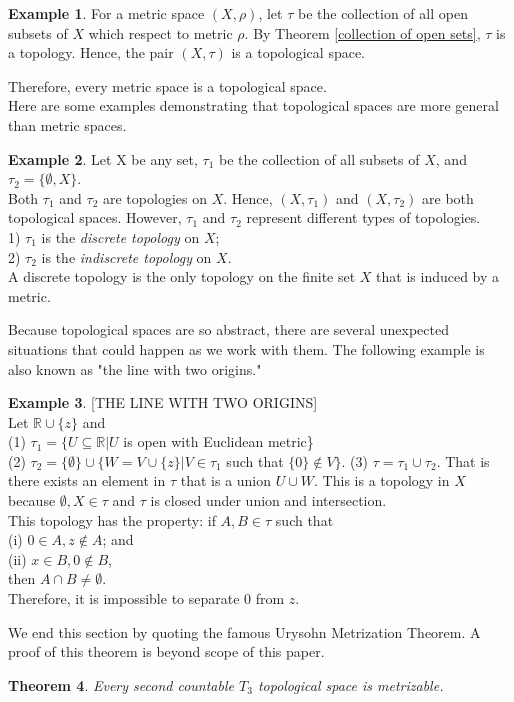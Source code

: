 \documentclass[12pt, reqno]{amsart}
\newtheorem{theorem}{Theorem}[section]
\theoremstyle{definition}
\newtheorem{example}[theorem]{Example}
\numberwithin{equation}{section}
\newcommand{\dR}{{\mathbb R}}
\begin{document}
\begin{example}
For a metric space $(X, \rho)$, let $\tau$ be the collection of all open subsets of $X$ which respect to metric $\rho$. By Theorem \ref{collection of open sets}, $\tau$ is a topology. Hence, the pair $(X, \tau)$ is a topological space.
\end{example}
Therefore, every metric space is a topological space.\\
Here are some examples demonstrating that topological spaces are more general than metric spaces.
\begin{example} \cite{s2}
Let X be any set, $\tau_1$ be the collection of all subsets of $X$, and $\tau_2 = \{\emptyset, X\}$.\\
Both $\tau_1$ and $\tau_2$ are topologies on $X$. Hence, $(X, \tau_1)$ and $(X, \tau_2)$ are both topological spaces. However, $\tau_1$ and $\tau_2$ represent different types of topologies.\\
1) $\tau_1$ is the \textit{discrete topology} on $X$;\\
2) $\tau_2$ is the \textit{indiscrete topology} on $X$.\\
A discrete topology is the only topology on the finite set $X$ that is induced by a metric.
\end{example}
Because topological spaces are so abstract, there are several unexpected situations that could happen as we work with them. The following example is also known as "the line with two origins."
\begin{example} \cite{s2} [THE LINE WITH TWO ORIGINS]\\
    Let $\dR \cup \{z\}$ and\\
    (1) $\tau_1 = \{U \subseteq \dR | U$ is open with Euclidean metric\}\\
    (2) $\tau_2 = \{\emptyset\} \cup \{W=V \cup \{z\}| V \in \tau_1$ such that $\{0\} \notin V\}$.
    (3) $\tau = \tau_1 \cup \tau_2$. That is there exists an element in $\tau$ that is a union $U \cup W$. This is a topology in $X$ because $\emptyset, X \in \tau$ and $\tau$ is closed under union and intersection.\\
    This topology has the property: if $A, B \in \tau$ such that\\
    (i) $0 \in A, z \notin A$; and\\
    (ii) $x \in B, 0 \notin B$,\\
    then $A \cap B \neq \emptyset$.\\
    Therefore, it is impossible to separate 0 from $z$.
\end{example}
We end this section by quoting the famous Urysohn Metrization Theorem. A proof of this theorem is beyond scope of this paper.
\begin{theorem}\cite{s5} Every second countable $T_3$ topological space is metrizable. 
\end{theorem}
\end{document}
